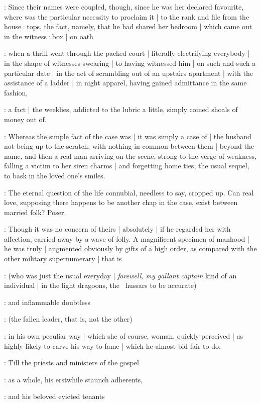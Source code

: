:
Since their names were coupled,
though,
since he was her declared favourite,
where was the particular necessity to proclaim it |
to the rank and file from the house·tops,
the fact,
namely,
that he had shared her bedroom |
which came out in the witness·box |
on oath

:
when a thrill went through the packed court |
literally electrifying everybody |
in the shape of witnesses swearing |
to having witnessed him |
on such and such a particular date |
in the act of scrambling out of an upstairs apartment |
with the assistance of a ladder |
in night apparel,
having gained admittance in the same fashion,

:
a fact |
the weeklies,
addicted to the lubric a little,
simply coined shoals of money out of.

:
Whereas the simple fact of the case was |
it was simply a case of |
the husband not being up to the scratch,
with nothing in common between them |
beyond the name,
and then a real man arriving on the scene,
strong to the verge of weakness,
falling a victim to her siren charms |
and forgetting home ties,
the usual sequel,
to bask in the loved one's smiles.

:
The eternal question of the life connubial,
needless to say,
cropped up.
Can real love,
supposing there happens to be another chap in the case,
exist between married folk?
Poser.

:
Though it was no concern of theirs |
absolutely |
if he regarded her with affection,
carried away by a wave of folly.
A magnificent specimen of manhood |
he was truly |
augmented obviously by gifts of a high order,
as compared with the other military supernumerary |
that is%

:
(who was just the usual everyday |
\emph{farewell, my gallant captain} kind of an individual |
in the light dragoons,
the ~hussars to be accurate)

:
and inflammable doubtless

:
(the fallen leader,
that is,
not the other)

:
in his own peculiar way |
which she of course,
woman,
quickly perceived |
as highly likely to carve his way to fame |
which he almost bid fair to do.

:
Till the priests and ministers of the gospel

:
as a whole,
his erstwhile staunch adherents,

:
and his beloved evicted tenants

